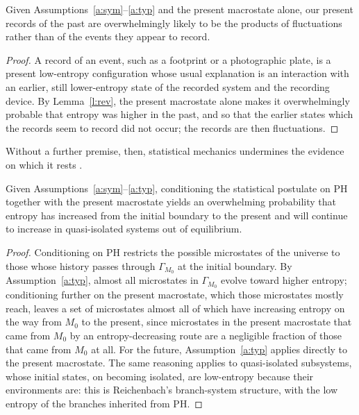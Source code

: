 \documentclass{situationist-preprint}
\begin{document}
\begin{corollary}\label{c:scep}
Given Assumptions~\ref{a:sym}--\ref{a:typ} and the present macrostate alone, our present records of the past are overwhelmingly likely to be the products of fluctuations rather than of the events they appear to record.
\end{corollary}

\begin{proof}
A record of an event, such as a footprint or a photographic plate, is a present low-entropy configuration whose usual explanation is an interaction with an earlier, still lower-entropy state of the recorded system and the recording device. By Lemma~\ref{l:rev}, the present macrostate alone makes it overwhelmingly probable that entropy was higher in the past, and so that the earlier states which the records seem to record did not occur; the records are then fluctuations.
\end{proof}

Without a further premise, then, statistical mechanics undermines the evidence on which it rests \citep{Albert2000}.

\begin{proposition}[Sufficiency]\label{p:suff}
Given Assumptions~\ref{a:sym}--\ref{a:typ}, conditioning the statistical postulate on PH together with the present macrostate yields an overwhelming probability that entropy has increased from the initial boundary to the present and will continue to increase in quasi-isolated systems out of equilibrium.
\end{proposition}

\begin{proof}
Conditioning on PH restricts the possible microstates of the universe to those whose history passes through $\Gamma_{M_0}$ at the initial boundary. By Assumption~\ref{a:typ}, almost all microstates in $\Gamma_{M_0}$ evolve toward higher entropy; conditioning further on the present macrostate, which those microstates mostly reach, leaves a set of microstates almost all of which have increasing entropy on the way from $M_0$ to the present, since microstates in the present macrostate that came from $M_0$ by an entropy-decreasing route are a negligible fraction of those that came from $M_0$ at all. For the future, Assumption~\ref{a:typ} applies directly to the present macrostate. The same reasoning applies to quasi-isolated subsystems, whose initial states, on becoming isolated, are low-entropy because their environments are: this is Reichenbach's branch-system structure, with the low entropy of the branches inherited from PH.
\end{proof}
\end{document}
